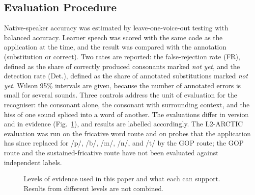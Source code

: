 \documentclass[conference]{IEEEtran}
\newcommand{\ipa}[1]{/#1/}
\begin{document}
\subsection{Evaluation Procedure}
Native-speaker accuracy was estimated by leave-one-voice-out testing with balanced accuracy. Learner speech was scored with the same code as the application at the time, and the result was compared with the annotation (substitution or correct). Two rates are reported: the false-rejection rate (FR), defined as the share of correctly produced consonants marked \textit{not yet}, and the detection rate (Det.), defined as the share of annotated substitutions marked \textit{not yet}. Wilson 95\% intervals are given, because the number of annotated errors is small for several sounds. Three controls address the unit of evaluation for the recogniser: the consonant alone, the consonant with surrounding context, and the hiss of one sound spliced into a word of another. The evaluations differ in version and in evidence (Fig.~\ref{fig:tiers}), and results are labelled accordingly. The L2-ARCTIC evaluation was run on the fricative word route and on probes that the application has since replaced for \ipa{p}, \ipa{b}, \ipa{m}, \ipa{n}, and \ipa{t\textesh} by the GOP route; the GOP route and the sustained-fricative route have not been evaluated against independent labels.

\begin{figure}[!t]
\centering
{}
\caption{Levels of evidence used in this paper and what each can support. Results from different levels are not combined.}
\label{fig:tiers}
\end{figure}
\end{document}
